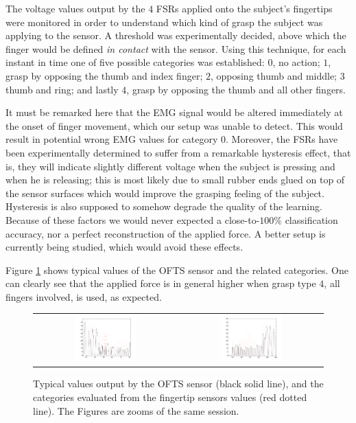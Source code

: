 The voltage values output by the $4$ FSRs applied onto the subject's
fingertips were monitored in order to understand which kind of grasp
the subject was applying to the sensor. A threshold was experimentally
decided, above which the finger would be defined \emph{in contact}
with the sensor. Using this technique, for each instant in time one of
five possible categories was established: $0$, no action; $1$, grasp
by opposing the thumb and index finger; $2$, opposing thumb and
middle; $3$ thumb and ring; and lastly $4$, grasp by opposing the
thumb and all other fingers.

It must be remarked here that the EMG signal would be altered
immediately at the onset of finger movement, which our setup was
unable to detect. This would result in potential wrong EMG values for
category $0$. Moreover, the FSRs have been experimentally determined
to suffer from a remarkable hysteresis effect, that is, they will
indicate slightly different voltage when the subject is pressing and
when he is releasing; this is most likely due to small rubber ends
glued on top of the sensor surfaces which would improve the grasping
feeling of the subject. Hysteresis is also supposed to somehow degrade
the quality of the learning. Because of these factors we would never
expected a close-to-$100\%$ classification accuracy, nor a perfect
reconstruction of the applied force. A better setup is currently being
studied, which would avoid these effects.

Figure \ref{fig:targets} shows typical values of the OFTS sensor and
the related categories. One can clearly see that the applied force is
in general higher when grasp type $4$, all fingers involved, is used,
as expected.

\begin{figure}[!ht] \centering
  \begin{tabular}{cc}
    \includegraphics[width=0.45\textwidth]{figs/targets_zoom1} &
    \includegraphics[width=0.45\textwidth]{figs/targets_zoom2} \\
  \end{tabular}
  \caption{Typical values output by the OFTS sensor (black solid line), and the
    categories evaluated from the fingertip sensors values (red dotted
    line). The Figures are zooms of the same session.}
  \label{fig:targets}
\end{figure}
